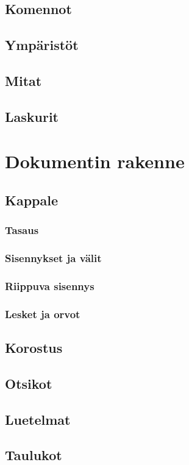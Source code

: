 \documentclass[notitlepage,oneside]{book}
\begin{document}
\section{Komennot}
\section{Ympäristöt}
\section{Mitat}
\section{Laskurit}



\chapter{Dokumentin rakenne}
\section{Kappale}
\subsection{Tasaus}
\subsection{Sisennykset ja välit}
\subsection{Riippuva sisennys}
\subsection{Lesket ja orvot}
\section{Korostus}
\section{Otsikot}
\section{Luetelmat}
\section{Taulukot}
\end{document}
